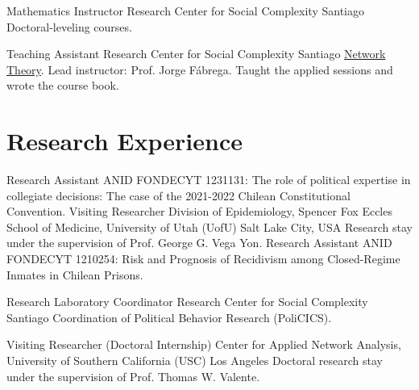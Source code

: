         {Mathematics Instructor}
        {Research Center for Social Complexity}
        {Santiago}
        {\newline Doctoral-leveling courses.}
        {}

        {Teaching Assistant}
        {Research Center for Social Complexity}
        {Santiago}
        {\newline \href{https://aoliveram.github.io/Redes-Sociales-2026/}{Network Theory}. Lead instructor: Prof. Jorge Fábrega. Taught the applied sessions and wrote the course book.}
        {}


\section{Research Experience}


        {Research Assistant}
        {ANID}
        {FONDECYT 1231131:}
        {The role of political expertise in collegiate decisions: The case of the 2021-2022 Chilean Constitutional Convention.}   %
        {}
        {Visiting Researcher}
        {Division of Epidemiology, Spencer Fox Eccles School of Medicine, University of Utah (UofU)}
        {Salt Lake City, USA}
        {\newline Research stay under the supervision of Prof. George G. Vega Yon.}   %
        {}
        {Research Assistant}
        {ANID}
        {FONDECYT 1210254:}
        {Risk and Prognosis of Recidivism among Closed-Regime Inmates in Chilean Prisons.}   %
        {}

        {Research Laboratory Coordinator}
        {Research Center for Social Complexity}
        {Santiago}
        {Coordination of Political Behavior Research (PoliCICS).}
        {}

        {Visiting Researcher (Doctoral Internship)}
        {Center for Applied Network Analysis, University of Southern California (USC)}
        {Los Angeles}
        {Doctoral research stay under the supervision of Prof. Thomas W. Valente.}
        {}
